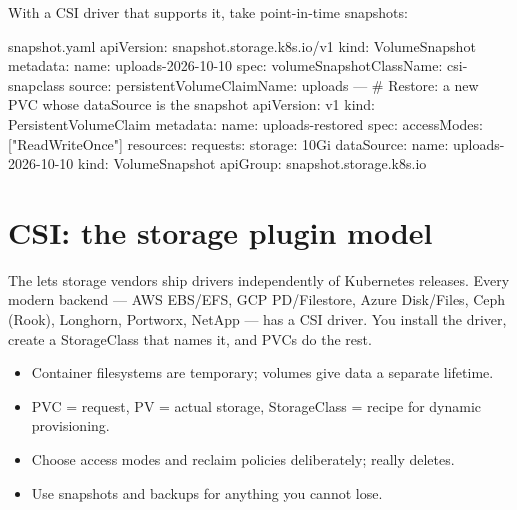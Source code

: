 With a CSI driver that supports it, take point-in-time snapshots:

\begin{yamlcode}{snapshot.yaml}
apiVersion: snapshot.storage.k8s.io/v1
kind: VolumeSnapshot
metadata:
  name: uploads-2026-10-10
spec:
  volumeSnapshotClassName: csi-snapclass
  source:
    persistentVolumeClaimName: uploads
---
# Restore: a new PVC whose dataSource is the snapshot
apiVersion: v1
kind: PersistentVolumeClaim
metadata:
  name: uploads-restored
spec:
  accessModes: ["ReadWriteOnce"]
  resources:
    requests:
      storage: 10Gi
  dataSource:
    name: uploads-2026-10-10
    kind: VolumeSnapshot
    apiGroup: snapshot.storage.k8s.io
\end{yamlcode}

\section{CSI: the storage plugin model}

The  lets storage vendors ship drivers
independently of Kubernetes releases. Every modern backend --- AWS EBS/EFS, GCP
PD/Filestore, Azure Disk/Files, Ceph (Rook), Longhorn, Portworx, NetApp --- has a
CSI driver. You install the driver, create a StorageClass that names it, and
PVCs do the rest.

\begin{recap}
\begin{itemize}
  \item Container filesystems are temporary; volumes give data a separate lifetime.
  \item PVC = request, PV = actual storage, StorageClass = recipe for dynamic provisioning.
  \item Choose access modes and reclaim policies deliberately;  really deletes.
  \item Use snapshots and backups for anything you cannot lose.
\end{itemize}
\end{recap}
